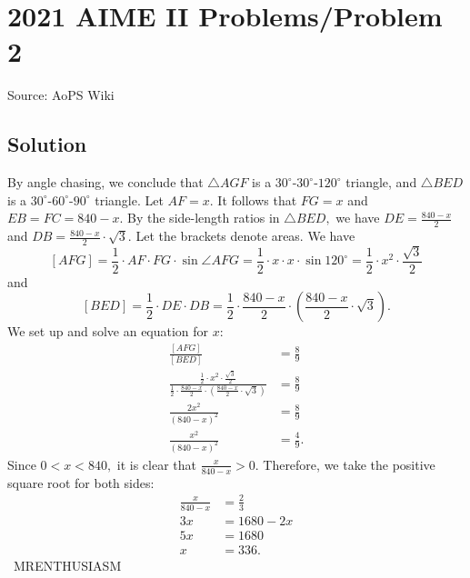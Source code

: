 \documentclass[12pt]{article}
\begin{document}
\section*{{2021 AIME II Problems/Problem 2}}
Source: AoPS Wiki

\subsection*{Solution}
By angle chasing, we conclude that $\triangle AGF$ is a $30^\circ\text{-}30^\circ\text{-}120^\circ$ triangle, and $\triangle BED$ is a $30^\circ\text{-}60^\circ\text{-}90^\circ$ triangle. Let $AF=x.$ It follows that $FG=x$ and $EB=FC=840-x.$ By the side-length ratios in $\triangle BED,$ we have $DE=\frac{840-x}{2}$ and $DB=\frac{840-x}{2}\cdot\sqrt3.$ Let the brackets denote areas. We have \[[AFG]=\frac12\cdot AF\cdot FG\cdot\sin{\angle AFG}=\frac12\cdot x\cdot x\cdot\sin{120^\circ}=\frac12\cdot x^2\cdot\frac{\sqrt3}{2}\] and \[[BED]=\frac12\cdot DE\cdot DB=\frac12\cdot\frac{840-x}{2}\cdot\left(\frac{840-x}{2}\cdot\sqrt3\right).\] We set up and solve an equation for $x:$ \begin{align*} \frac{[AFG]}{[BED]}&=\frac89 \\ \frac{\frac12\cdot x^2\cdot\frac{\sqrt3}{2}}{\frac12\cdot\frac{840-x}{2}\cdot\left(\frac{840-x}{2}\cdot\sqrt3\right)}&=\frac89 \\ \frac{2x^2}{(840-x)^2}&=\frac89 \\ \frac{x^2}{(840-x)^2}&=\frac49. \end{align*} Since $0<x<840,$ it is clear that $\frac{x}{840-x}>0.$ Therefore, we take the positive square root for both sides: \begin{align*} \frac{x}{840-x}&=\frac23 \\ 3x&=1680-2x \\ 5x&=1680 \\ x&=\boxed{336}. \end{align*} ~MRENTHUSIASM
\end{document}
